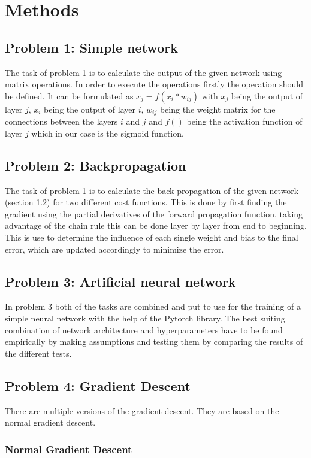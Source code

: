 \chapter{Methods}
\section{Problem 1: Simple network}
The task of problem 1 is to calculate the output of the given network using matrix operations.
In order to execute the operations firstly the operation should be defined.
It can be formulated as $x_j=f(x_{i}*w_{ij})$ with $x_j$ being the output of layer $j$, $x_{i}$ being the output of layer $i$, $w_{ij}$ being the weight matrix for the connections between the layers $i$ and $j$ and $f()$ being the activation function of layer $j$ which in our case is the sigmoid function.\\

   
\section{Problem 2: Backpropagation}
The task of problem 1 is to calculate the back propagation of the given network (section 1.2) for two different cost functions. This is done by first finding the gradient using the partial derivatives of the forward propagation function, taking advantage of the chain rule this can be done layer by layer from end to beginning. This is use to determine the influence of each single weight and bias to the final error, which are updated accordingly to minimize the error.
\section{Problem 3: Artificial neural network}

In problem 3 both of the tasks are combined and put to use for the training of a simple neural network with the help of the Pytorch library. The best suiting combination of network architecture and hyperparameters have to be found empirically by making assumptions and testing them by comparing the results of the different tests.
\section{Problem 4: Gradient Descent}\label{ch:methods:sec:4}

There are multiple versions of the gradient descent.
They are based on the normal gradient descent.

\subsection{Normal Gradient Descent}

